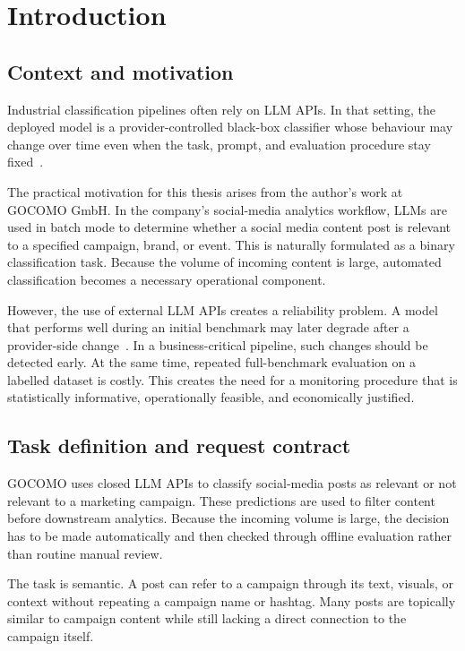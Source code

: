\chapter{Introduction}

\section{Context and motivation}
Industrial classification pipelines often rely on LLM APIs. In that setting, the deployed model is a provider-controlled black-box classifier whose behaviour may change over time even when the task, prompt, and evaluation procedure stay fixed~\cite{chen2023chatgpt}.

The practical motivation for this thesis arises from the author's work at GOCOMO GmbH. In the company's social-media analytics workflow, LLMs are used in batch mode to determine whether a social media content post is relevant to a specified campaign, brand, or event. This is naturally formulated as a binary classification task. Because the volume of incoming content is large, automated classification becomes a necessary operational component.

However, the use of external LLM APIs creates a reliability problem. A model that performs well during an initial benchmark may later degrade after a provider-side change~\cite{chen2023chatgpt}. In a business-critical pipeline, such changes should be detected early. At the same time, repeated full-benchmark evaluation on a labelled dataset is costly. This creates the need for a monitoring procedure that is statistically informative, operationally feasible, and economically justified.

\section{Task definition and request contract}
GOCOMO uses closed LLM APIs to classify social-media posts as relevant or not relevant to a marketing campaign. These predictions are used to filter content before downstream analytics. Because the incoming volume is large, the decision has to be made automatically and then checked through offline evaluation rather than routine manual review.

The task is semantic. A post can refer to a campaign through its text, visuals, or context without repeating a campaign name or hashtag. Many posts are topically similar to campaign content while still lacking a direct connection to the campaign itself.

